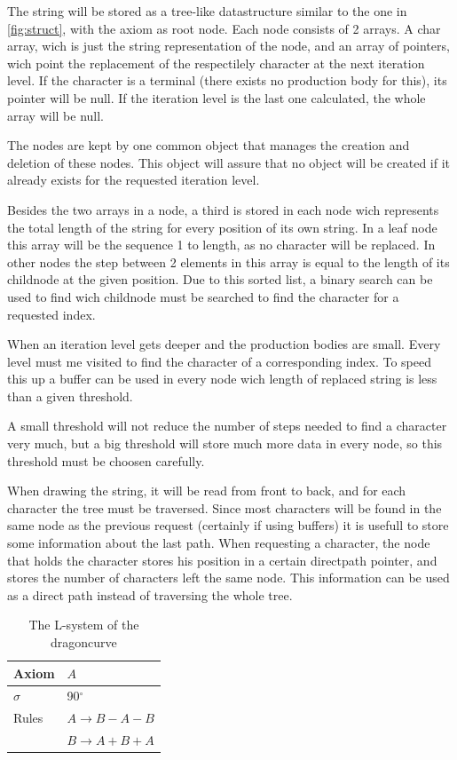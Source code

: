\documentclass[11pt,a4paper]{article}
\newcommand{\degree}{\ensuremath{^\circ}}
\begin{document}
The string will be stored as a tree-like datastructure similar to the one in \ref{fig:struct}, with the axiom as root node. Each node consists of 2 arrays. A char array, wich is just the string representation of the node, and an array of pointers, wich point the replacement of the respectilely character at the next iteration level. If the character is a terminal (there exists no production body for this), its pointer will be null. If the iteration level is the last one calculated, the whole array will be null.

The nodes are kept by one common object that manages the creation and deletion of these nodes. This object will assure that no object will be created if it already exists for the requested iteration level.

Besides the two arrays in a node, a third is stored in each node wich represents the total length of the string for every position of its own string. In a leaf node this array will be the sequence 1 to length, as no character will be replaced. In other nodes the step between 2 elements in this array is equal to the length of its childnode at the given position. Due to this sorted list, a binary search can be used to find wich childnode must be searched to find the character for a requested index.

When an iteration level gets deeper and the production bodies are small. Every level must me visited to find the character of a corresponding index. To speed this up a buffer can be used in every node wich length of replaced string is less than a given threshold.

A small threshold will not reduce the number of steps needed to find a character very much, but a big threshold will store much more data in every node, so this threshold must be choosen carefully.

When drawing the string, it will be read from front to back, and for each character the tree must be traversed. Since most characters will be found in the same node as the previous request (certainly if using buffers) it is usefull to store some information about the last path. When requesting a character, the node that holds the character stores his position in a certain directpath pointer, and stores the number of characters left the same node. This information can be used as a direct path instead of traversing the whole tree.

\begin{table}
\center
\begin{tabular}{l l}
Axiom & $A$ \\ \hline
$\sigma$ & 90\degree \\ \hline
Rules & $A \rightarrow B-A-B$ \\
      & $B \rightarrow A+B+A$ \\
\end{tabular}
\caption{The L-system of the dragoncurve}
\end{table}
\end{document}
